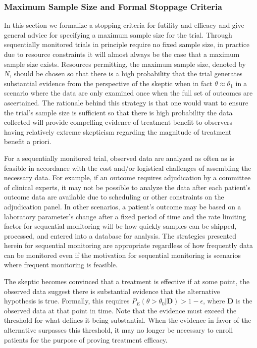 \documentclass[12pt]{article}
\begin{document}
\subsubsection{Maximum Sample Size and Formal Stoppage Criteria}
In this section we formalize a stopping criteria for futility and efficacy and give general 
advice for specifying a maximum sample size for the trial.
%
Through sequentially monitored trials in principle require no fixed sample size, in practice due to resource 
constraints it will almost always be the case that a maximum sample size exists. 
%
Resources permitting, the maximum sample size, denoted by $N$, should be chosen so that there is a 
high probability that the trial generates substantial evidence from the perspective of the skeptic when in 
fact $\theta \approx \theta_1$ in a scenario where the data are only examined once when the full set of 
outcomes are ascertained.
%
The rationale behind this strategy is that one would want to ensure the trial's sample size is sufficient so that
there is high probability the data collected will provide compelling evidence of treatment benefit to observers 
having relatively extreme skepticism regarding the magnitude of treatment benefit a priori.  


For a sequentially monitored trial, observed data are analyzed as often as is feasible in accordance with 
the cost and/or logistical challenges of assembling the necessary data.
%
For example, if an outcome requires adjudication by a committee of clinical experts, it may not be possible to analyze the
data after each patient's outcome data are available due to scheduling or other constraints on the adjudication panel.
%
In other scenarios, a patient's outcome may be based on a laboratory parameter's change after a fixed period of time
and the rate limiting factor for sequential monitoring will be how quickly samples can be shipped, processed, and entered
into a database for analysis.  
%
The strategies presented herein for sequential monitoring are appropriate regardless of how frequently data can be monitored
even if the motivation for sequential monitoring is scenarios where frequent monitoring is feasible.


The skeptic becomes convinced that a treatment is effective if at some point, the observed data suggest there is 
substantial evidence that the alternative hypothesis is true. 
%
Formally, this requires $P_E(\theta>\theta_0| \mathbf{D})>1-\epsilon$, where $\mathbf{D}$ is the observed data at 
that point in time.
%
Note that the evidence must exceed the threshold for what defines it being substantial.
%
When the evidence in favor of the alternative surpasses this threshold, it may no longer be necessary to enroll patients
for the purpose of proving treatment efficacy.
\end{document}
